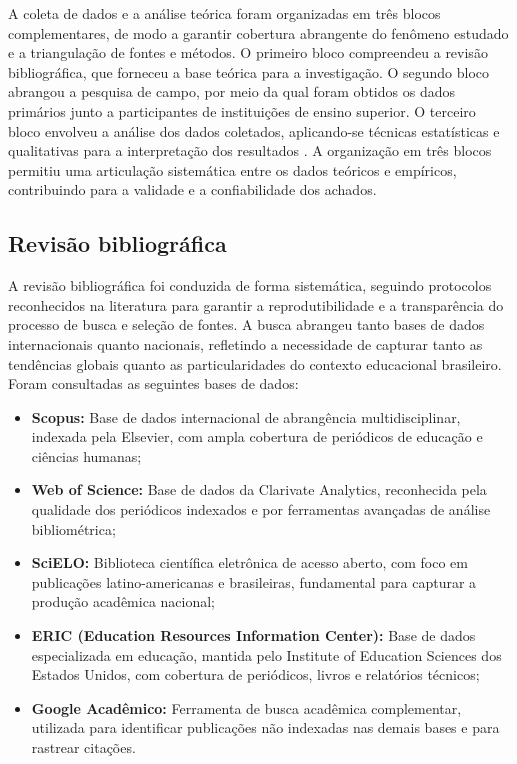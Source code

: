A coleta de dados e a análise teórica foram organizadas em três blocos complementares, de modo a garantir cobertura abrangente do fenômeno estudado e a triangulação de fontes e métodos. O primeiro bloco compreendeu a revisão bibliográfica, que forneceu a base teórica para a investigação. O segundo bloco abrangou a pesquisa de campo, por meio da qual foram obtidos os dados primários junto a participantes de instituições de ensino superior. O terceiro bloco envolveu a análise dos dados coletados, aplicando-se técnicas estatísticas e qualitativas para a interpretação dos resultados \cite{BARDIN2016}. A organização em três blocos permitiu uma articulação sistemática entre os dados teóricos e empíricos, contribuindo para a validade e a confiabilidade dos achados.

\subsection{Revisão bibliográfica}
\label{subsec:revisao_biblio}

A revisão bibliográfica foi conduzida de forma sistemática, seguindo protocolos reconhecidos na literatura para garantir a reprodutibilidade e a transparência do processo de busca e seleção de fontes. A busca abrangeu tanto bases de dados internacionais quanto nacionais, refletindo a necessidade de capturar tanto as tendências globais quanto as particularidades do contexto educacional brasileiro. Foram consultadas as seguintes bases de dados:

\begin{itemize}
    \item \textbf{Scopus:} Base de dados internacional de abrangência multidisciplinar, indexada pela Elsevier, com ampla cobertura de periódicos de educação e ciências humanas;
    \item \textbf{Web of Science:} Base de dados da Clarivate Analytics, reconhecida pela qualidade dos periódicos indexados e por ferramentas avançadas de análise bibliométrica;
    \item \textbf{SciELO:} Biblioteca científica eletrônica de acesso aberto, com foco em publicações latino-americanas e brasileiras, fundamental para capturar a produção acadêmica nacional;
    \item \textbf{ERIC (Education Resources Information Center):} Base de dados especializada em educação, mantida pelo Institute of Education Sciences dos Estados Unidos, com cobertura de periódicos, livros e relatórios técnicos;
    \item \textbf{Google Acadêmico:} Ferramenta de busca acadêmica complementar, utilizada para identificar publicações não indexadas nas demais bases e para rastrear citações.
\end{itemize}

